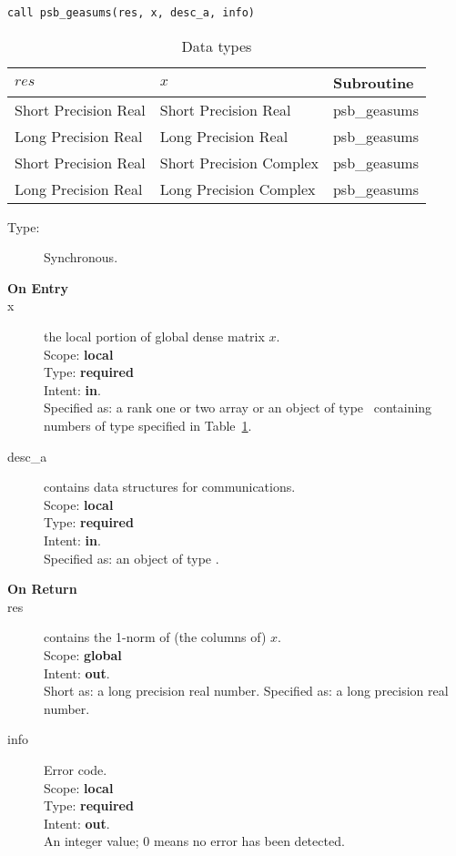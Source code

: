 \begin{verbatim}
call psb_geasums(res, x, desc_a, info)
\end{verbatim}

\begin{table}[h]
\begin{center}
\begin{tabular}{lll}
\hline
$res$ & $x$ & {\bf Subroutine}\\
\hline
Short Precision Real&Short Precision Real & psb\_geasums \\
Long Precision Real&Long Precision Real & psb\_geasums \\
Short Precision Real&Short Precision Complex & psb\_geasums \\
Long Precision Real&Long Precision Complex & psb\_geasums \\
\hline
\end{tabular}
\end{center}
\caption{Data types\label{tab:f90asums}}
\end{table}

\begin{description}
\item[Type:] Synchronous.
\item[\bf On Entry]
\item[x] the local portion of global dense matrix
$x$. %
\\
Scope: {\bf local} \\
Type: {\bf required} \\
Intent: {\bf in}.\\
Specified as: a rank one or two array or an object of type \vdata\ 
containing numbers of type specified in
Table~\ref{tab:f90asums}.
\item[desc\_a] contains data structures for communications.\\
Scope: {\bf local} \\
Type: {\bf required}\\
Intent: {\bf in}.\\
Specified as: an object of type \descdata.

\item[\bf On Return] 
\item[res] contains the 1-norm of (the columns of) $x$.\\
Scope: {\bf global} \\
Intent: {\bf out}.\\
Short as: a long precision real  number.
Specified as: a long precision real  number.
\item[info] Error code.\\
Scope: {\bf local} \\
Type: {\bf required} \\
Intent: {\bf out}.\\
An integer value; 0 means no error has been detected. 
\end{description}


